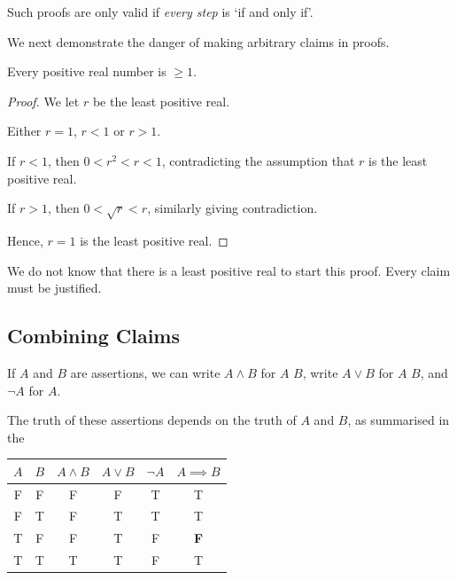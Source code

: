 Such proofs are only valid if \emph{every step} is `if and only if'.

We next demonstrate the danger of making arbitrary claims in proofs.

\begin{claim}
    Every positive real number is \(\geq 1\).
\end{claim}

\begin{proof}
    We let \(r\) be the least positive real.

    Either \(r = 1\), \(r < 1\) or \(r > 1\).

    If \(r < 1\), then \(0 < r^2 < r < 1\), contradicting the assumption that \(r\) is the least positive real.

    If \(r > 1\), then \(0 < \sqrt{r} < r\), similarly giving contradiction.

    Hence, \(r = 1\) is the least positive real.
\end{proof}

We do not know that there is a least positive real to start this proof. Every claim must be justified.

\subsection{Combining Claims}
\label{sec:combining-claims}

\begin{definition}
    If \(A\) and \(B\) are assertions, we can write \(A \land B\) for \(A\)  \(B\), write \(A \lor B\) for \(A\)  \(B\), and \(\lnot A\) for  \(A\).
\end{definition}

The truth of these assertions depends on the truth of \(A\) and \(B\), as summarised in the

\begin{table}[ht!]
    \centering
    \begin{tabular}{cc|cccc}
        \(A\) & \(B\) & \(A \land B\) & \(A \lor B\) & \(\lnot A\) & \(A \implies B\) \\
        \hline
        F & F & F & F & T & T \\
        F & T & F & T & T & T \\
        T & F & F & T & F & \textbf{F} \\
        T & T & T & T & F & T
    \end{tabular}
\end{table}

